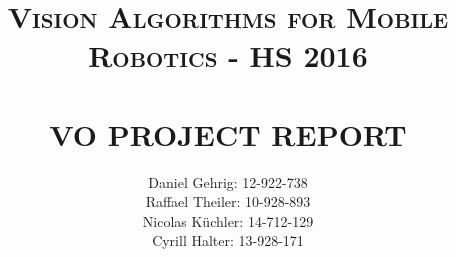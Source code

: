 \documentclass[12pt]{report}
\begin{document}
\title{ \normalsize \textsc{Vision Algorithms for Mobile Robotics - HS 2016}
\\ [2.0cm]
\HRule{0.5pt} \\
\LARGE \textbf{\uppercase{VO Project Report}}
\HRule{2pt} \\ [0.5cm]
}

\author{
Daniel Gehrig: 12-922-738 \\
Raffael Theiler: 10-928-893 \\
Nicolas Küchler: 14-712-129 \\
Cyrill Halter: 13-928-171 }
\date{}

\maketitle
\tableofcontents
\newpage

\sectionfont{\scshape}
\titlespacing*{\chapter}{0pt}{-20pt}{30pt}

%

\def \criticalKpBA {50\,}
\def \trackerMaxBidirectionalErrorBA {2.1\,}
\def \ransacNumIterationsBA {2000\,}
\def \baEveryNthFrame {4\,} 
\def \baReplace {6\,}
\def \baReplaceframes{6\,} %

\def \harrisPatchSize {9\,}
\def \harrisKappa {0.08\,}
\def \numKeypoints {800\,}
\def \nonmaximumSupressionRadius {10\,}
\def \descriptorRadius {13\,}
\def \matchLambda {8\,}
\def \triangulationAngleThreshold {3\,}
\def \candidateCap {500\,}
\def \addCandidateEachFrame {100\,}
\def \triangulationMaxReprError {20\,}
\def \criticalKp {0\,}
\def \trackerMaxBidirectionalError {infinity\,}
\def \trackerBlocksize {13\,}
\def \ransacNumIterations {500\,}
\def \ransacPixelTolerance {10\,}

\newcommand{\coderef}[1]{[$\square$\kern-0.78em{$\equiv$}\:#1]\:}






\end{document}

